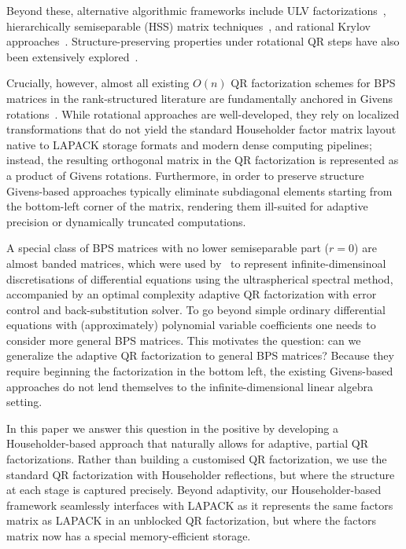 \documentclass[a4paper,fleqn]{cas-sc}
\begin{document}
Beyond these, alternative algorithmic frameworks include ULV factorizations~\citep{chandrasekaran2003fast}, hierarchically semiseparable (HSS) matrix techniques~\citep{chandrasekaran2007fast, chandrasekaran2006fast, massei2020hm, xia2010fast}, and rational Krylov approaches~\citep{fasino2005rational, vandebril2008rational}. Structure-preserving properties under rotational QR steps have also been extensively explored~\citep{vandebril2005implicit,delvaux2006rank, delvaux2006structures, eidelman2005qr, delvaux2008givens, vandebril2005note}.


Crucially, however, almost all existing $O(n)$ QR factorization schemes for BPS matrices in the rank-structured literature are fundamentally anchored in Givens rotations~\citep{delvaux2008qr, mastronardi2001fast, van2004two}. While rotational approaches are well-developed, they rely on localized transformations that do not yield the standard Householder factor matrix layout native to LAPACK storage formats and modern dense computing pipelines; instead, the resulting orthogonal matrix in the QR factorization is represented as a product of Givens rotations. Furthermore, in order to preserve structure Givens-based approaches typically eliminate subdiagonal elements starting from the bottom-left corner of the matrix, rendering them ill-suited for adaptive precision or dynamically truncated computations. 


A special class of BPS matrices with no lower semiseparable part ($r = 0$) are almost banded matrices, which were used by~\cite{olver2013fast} to represent infinite-dimensinoal discretisations of differential equations using the ultraspherical spectral method, accompanied by an optimal complexity adaptive QR factorization with error control and back-substitution solver. To go beyond simple ordinary differential equations with (approximately) polynomial variable coefficients one needs to consider more general BPS matrices. This motivates the question: can we generalize the adaptive QR factorization to general BPS matrices? Because they require beginning the factorization in the bottom left, the existing Givens-based approaches do not lend themselves to the infinite-dimensional linear algebra setting.


In this paper we answer this question in the positive by developing  a Householder-based approach that naturally allows for adaptive, partial QR factorizations. Rather than building a customised  QR factorization, we use the standard QR factorization with Householder reflections, but where the structure at each stage is captured precisely. 
Beyond adaptivity, our Householder-based framework seamlessly interfaces with LAPACK as it represents the same factors matrix as LAPACK in an unblocked QR factorization, but where the factors matrix now has a special memory-efficient storage.
\end{document}
